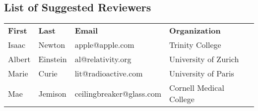 \subsection*{List of Suggested Reviewers}

\begin{tabular}[c]{llll}
\textbf{First} & \textbf{Last} & \textbf{Email} & \textbf{Organization}\\
Isaac & Newton & apple@apple.com & Trinity College\\
Albert & Einstein & al@relativity.org & University of Zurich\\
Marie & Curie & lit@radioactive.com & University of Paris\\
Mae & Jemison & ceilingbreaker@glass.com & Cornell Medical College\\
\end{tabular}
